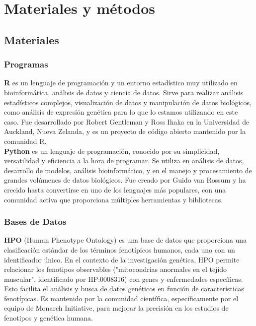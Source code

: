 \section{Materiales y métodos}


\subsection{\textbf{Materiales}}

\subsubsection{Programas}
 

\textbf{R} es un lenguaje de programación y un entorno estadístico muy utilizado en bioinformática, análisis de datos y ciencia de datos.
Sirve para realizar análisis estadísticos complejos, visualización de datos y manipulación de datos biológicos, como análisis de expresión genética para lo que lo estamos utilizando en este caso.
Fue desarrollado por Robert Gentleman y Ross Ihaka en la Universidad de Auckland, Nueva Zelanda, y es un proyecto de código abierto mantenido por la comunidad R.\cite{jimenez2019introduccion}\\


\textbf{Python} es un lenguaje de programación, conocido por su simplicidad, versatilidad y eficiencia a la hora de programar.
Se utiliza en análisis de datos, desarrollo de modelos, análisis bioinformático, y en el manejo y procesamiento de grandes volúmenes de datos biológicos.
Fue creado por Guido van Rossum y ha crecido hasta convertirse en uno de los lenguajes más populares, con una comunidad activa que proporciona múltiples herramientas y bibliotecas.\cite{Python_Teams}
\subsubsection{Bases de Datos}


\textbf{HPO} (Human Phenotype Ontology) es una base de datos que proporciona una clasificación estándar de los términos fenotípicos humanos, cada uno con un identificador único.
En el contexto de la investigación genética, HPO permite relacionar los fenotipos observables ("mitocondrias anormales en el tejido muscular", identificado por HP:0008316) con genes y enfermedades específicas. Esto facilita el análisis y busca de datos genéticos en función de características fenotípicas.
Es mantenido por la comunidad científica, específicamente por el equipo de Monarch Initiative, para mejorar la precisión en los estudios de fenotipos y genética humana.\cite{kohler2014human}\\





